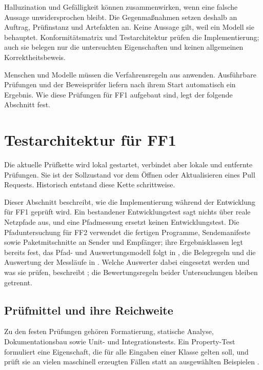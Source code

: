 Halluzination und Gefälligkeit können zusammenwirken, wenn eine falsche Aussage unwidersprochen bleibt.
Die Gegenmaßnahmen setzen deshalb an Auftrag, Prüfinstanz und Artefakten an. Keine Aussage gilt, weil ein
Modell sie behauptet. Konformitätsmatrix und Testarchitektur prüfen die Implementierung; auch sie belegen
nur die untersuchten Eigenschaften und keinen allgemeinen Korrektheitsbeweis.

Menschen und Modelle müssen die Verfahrensregeln aus  anwenden. Ausführbare
Prüfungen und der Beweisprüfer liefern nach ihrem Start automatisch ein Ergebnis. Wie diese Prüfungen für FF1 aufgebaut
sind, legt der folgende Abschnitt fest.

\section{Testarchitektur für FF1}
\label{sec:pruefkette}

Die aktuelle Prüfkette wird lokal gestartet, verbindet aber lokale und entfernte Prüfungen. Sie ist der
Sollzustand vor dem Öffnen oder Aktualisieren eines Pull Requests. Historisch entstand diese Kette
schrittweise.

Dieser Abschnitt beschreibt, wie die Implementierung während der Entwicklung für FF1 geprüft wird.
Ein bestandener Entwicklungstest sagt nichts über reale Netzpfade aus, und eine Pfadmessung ersetzt keinen
Entwicklungstest. Die Pfaduntersuchung für FF2 verwendet die fertigen Programme, Sendemanifeste sowie
Paketmitschnitte an Sender und Empfänger; ihre Ergebnisklassen legt bereits
 fest, das Pfad- und Auswertungsmodell folgt in ,
die Belegregeln und die Auswertung der Messläufe in . Welche Auswerter dabei
eingesetzt werden und was sie prüfen, beschreibt ; die Bewertungsregeln
beider Untersuchungen bleiben getrennt.

\subsection{Prüfmittel und ihre Reichweite}
\label{subsec:pruefmittel}

Zu den festen Prüfungen gehören Formatierung, statische Analyse, Dokumentationsbau sowie Unit- und
Integrationstests. Ein Property-Test formuliert eine
Eigenschaft, die für alle Eingaben einer Klasse gelten soll, und prüft sie an vielen maschinell erzeugten
Fällen statt an ausgewählten Beispielen \cite{proptest}.

